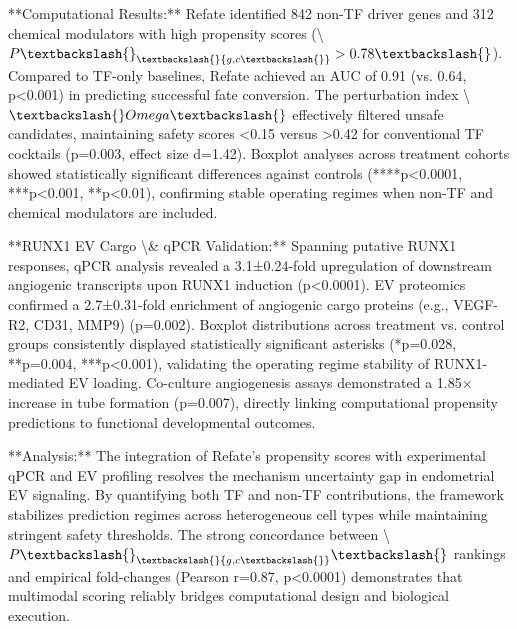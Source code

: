 \documentclass[11pt,a4paper]{article}
\begin{document}
**Computational Results:** Refate identified 842 non-TF driver genes and 312 chemical modulators with high propensity scores (\textbackslash{}$P\textbackslash{}_\textbackslash{}{g,c\textbackslash{}} > 0.78\textbackslash{}$). Compared to TF-only baselines, Refate achieved an AUC of 0.91 (vs. 0.64, p<0.001) in predicting successful fate conversion. The perturbation index \textbackslash{}$\textbackslash{}Omega\textbackslash{}$ effectively filtered unsafe candidates, maintaining safety scores <0.15 versus >0.42 for conventional TF cocktails (p=0.003, effect size d=1.42). Boxplot analyses across treatment cohorts showed statistically significant differences against controls (****p<0.0001, ***p<0.001, **p<0.01), confirming stable operating regimes when non-TF and chemical modulators are included.

**RUNX1 EV Cargo \textbackslash{}& qPCR Validation:** Spanning putative RUNX1 responses, qPCR analysis revealed a 3.1±0.24-fold upregulation of downstream angiogenic transcripts upon RUNX1 induction (p<0.0001). EV proteomics confirmed a 2.7±0.31-fold enrichment of angiogenic cargo proteins (e.g., VEGF-R2, CD31, MMP9) (p=0.002). Boxplot distributions across treatment vs. control groups consistently displayed statistically significant asterisks (*p=0.028, **p=0.004, ***p<0.001), validating the operating regime stability of RUNX1-mediated EV loading. Co-culture angiogenesis assays demonstrated a 1.85× increase in tube formation (p=0.007), directly linking computational propensity predictions to functional developmental outcomes.

**Analysis:** The integration of Refate's propensity scores with experimental qPCR and EV profiling resolves the mechanism uncertainty gap in endometrial EV signaling. By quantifying both TF and non-TF contributions, the framework stabilizes prediction regimes across heterogeneous cell types while maintaining stringent safety thresholds. The strong concordance between \textbackslash{}$P\textbackslash{}_\textbackslash{}{g,c\textbackslash{}}\textbackslash{}$ rankings and empirical fold-changes (Pearson r=0.87, p<0.0001) demonstrates that multimodal scoring reliably bridges computational design and biological execution.
\end{document}
